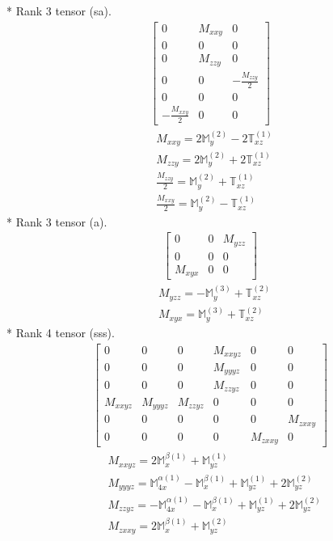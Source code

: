 \documentclass[fleqn,8pt,landscape]{jsarticle}
\begin{document}
* Rank 3 tensor (sa).
\begin{align*}
\begin{bmatrix} 0 & M_{xxy} & 0 \\ 0 & 0 & 0 \\ 0 & M_{zzy} & 0 \\ 0 & 0 & - \frac{M_{zzy}}{2} \\ 0 & 0 & 0 \\ - \frac{M_{xxy}}{2} & 0 & 0 \end{bmatrix}
\end{align*}
\begin{align*}
& M_{xxy} = 2 \mathbb{M}_{y}^{(2)} - 2 \mathbb{T}_{xz}^{(1)} \\
& M_{zzy} = 2 \mathbb{M}_{y}^{(2)} + 2 \mathbb{T}_{xz}^{(1)} \\
& \frac{M_{zzy}}{2} = \mathbb{M}_{y}^{(2)} + \mathbb{T}_{xz}^{(1)} \\
& \frac{M_{xxy}}{2} = \mathbb{M}_{y}^{(2)} - \mathbb{T}_{xz}^{(1)}
\end{align*}
* Rank 3 tensor (a).
\begin{align*}
\begin{bmatrix} 0 & 0 & M_{yzz} \\ 0 & 0 & 0 \\ M_{xyx} & 0 & 0 \end{bmatrix}
\end{align*}
\begin{align*}
& M_{yzz} = - \mathbb{M}_{y}^{(3)} + \mathbb{T}_{xz}^{(2)} \\
& M_{xyx} = \mathbb{M}_{y}^{(3)} + \mathbb{T}_{xz}^{(2)}
\end{align*}
* Rank 4 tensor (sss).
\begin{align*}
\begin{bmatrix} 0 & 0 & 0 & M_{xxyz} & 0 & 0 \\ 0 & 0 & 0 & M_{yyyz} & 0 & 0 \\ 0 & 0 & 0 & M_{zzyz} & 0 & 0 \\ M_{xxyz} & M_{yyyz} & M_{zzyz} & 0 & 0 & 0 \\ 0 & 0 & 0 & 0 & 0 & M_{zxxy} \\ 0 & 0 & 0 & 0 & M_{zxxy} & 0 \end{bmatrix}
\end{align*}
\begin{align*}
& M_{xxyz} = 2 \mathbb{M}_{x}^{\beta(1)} + \mathbb{M}_{yz}^{(1)} \\
& M_{yyyz} = \mathbb{M}_{4x}^{\alpha(1)} - \mathbb{M}_{x}^{\beta(1)} + \mathbb{M}_{yz}^{(1)} + 2 \mathbb{M}_{yz}^{(2)} \\
& M_{zzyz} = - \mathbb{M}_{4x}^{\alpha(1)} - \mathbb{M}_{x}^{\beta(1)} + \mathbb{M}_{yz}^{(1)} + 2 \mathbb{M}_{yz}^{(2)} \\
& M_{zxxy} = 2 \mathbb{M}_{x}^{\beta(1)} + \mathbb{M}_{yz}^{(2)}
\end{align*}
\end{document}
